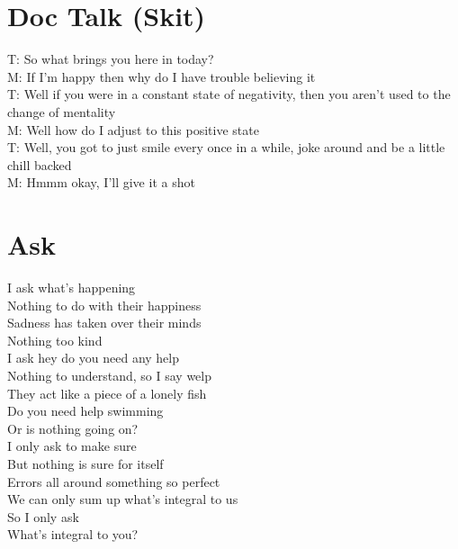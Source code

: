 \documentclass[12pt, b5paper, oneside]{book}
\begin{document}
\section{Doc Talk (Skit)}
T: So what brings you here in today?
\\M: If I'm happy then why do I have trouble believing it
\\T: Well if you were in a constant state of negativity, then you aren't used to the change of mentality
\\M: Well how do I adjust to this positive state
\\T: Well, you got to just smile every once in a while, joke around and be a little chill backed
\\M: Hmmm okay, I'll give it a shot 
\section{Ask}
I ask what's happening
\\Nothing to do with their happiness
\\Sadness has taken over their minds
\\Nothing too kind
\\I ask hey do you need any help
\\Nothing to understand, so I say welp
\\They act like a piece of a lonely fish
\\Do you need help swimming
\\Or is nothing going on?
\\I only ask to make sure
\\But nothing is sure for itself
\\Errors all around something so perfect
\\We can only sum up what's integral to us
\\So I only ask
\\What's integral to you? 
\newpage
\end{document}
